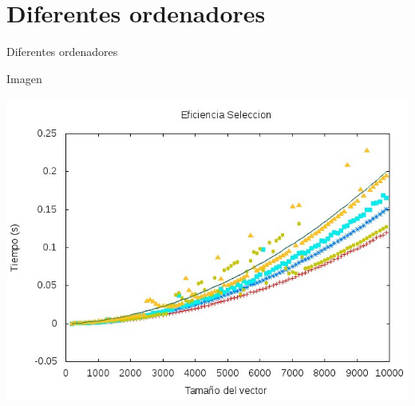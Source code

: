 \documentclass[compress]{beamer}
\begin{document}
\section{Diferentes ordenadores}
\begin{frame}{Diferentes ordenadores}
	\begin{alertblock}{Imagen}
	\begin{center}
	\includegraphics[scale=0.50]{../Graficas/Seleccion/total_Seleccion.jpeg}
	\end{center}
	\end{alertblock}
\end{frame}

\end{document}

